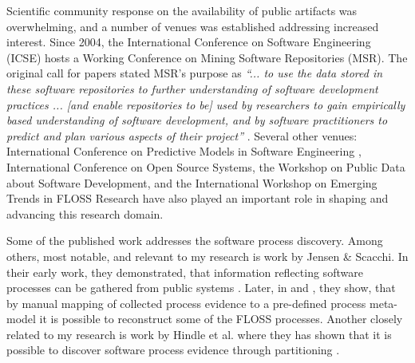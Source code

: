 Scientific community response on the availability of public artifacts was overwhelming, and a number of 
venues was established addressing increased interest. 
Since 2004, the International Conference on Software Engineering (ICSE) hosts a Working Conference on 
Mining Software Repositories (MSR). The original call for papers stated MSR's purpose as 
\textit{``... to use the data stored in these software repositories to further understanding of software 
development practices ... [and enable repositories to be] used by researchers to gain empirically based 
understanding of software development, and by software practitioners to predict and plan various aspects 
of their project''} \cite{msr2004} \cite{citeulike:7853299}. 
Several other venues: International Conference on Predictive Models in Software Engineering \cite{promise12}, 
International Conference on Open Source Systems, the Workshop on Public Data about Software Development, 
and the International Workshop on Emerging Trends in FLOSS Research have also played
an important role in shaping and advancing this research domain.

Some of the published work addresses the software process discovery. Among others, most notable, and 
relevant to my research is work by Jensen \& Scacchi. In their early work, they demonstrated, that 
information reflecting software processes can be gathered from public systems \cite{citeulike:12550640}. 
Later, in \cite{citeulike:5043664} and \cite{citeulike:5128808}, they show, that by manual mapping of 
collected process evidence to a pre-defined process meta-model it is possible to reconstruct some 
of the FLOSS processes. 
Another closely related to my research is work by Hindle et al. where they has shown that it is possible to 
discover software process evidence through partitioning \cite{citeulike:10377366}.

